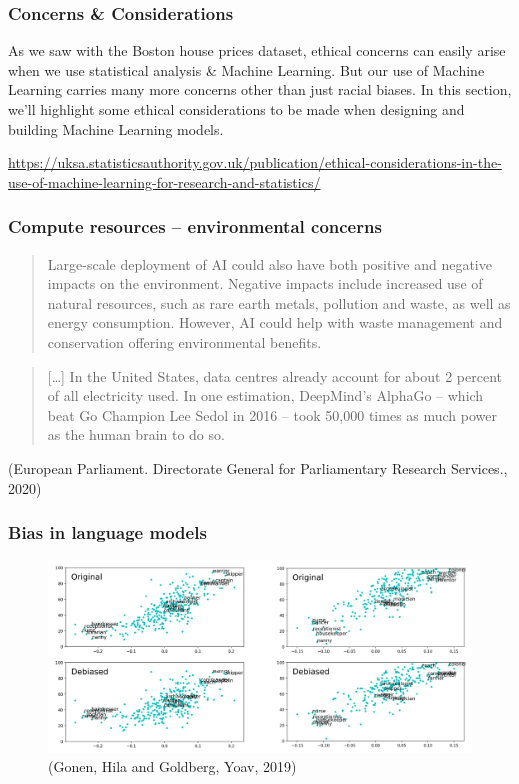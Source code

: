 \documentclass[10pt]{beamer}
\begin{document}
\subsubsection*{Concerns \& Considerations}
\label{sec:org5cfd4b2}

As we saw with the Boston house prices dataset, ethical concerns can easily arise
when we use statistical analysis \& Machine Learning. But our use of Machine Learning
carries many more concerns other than just racial biases. In this section, we'll
highlight some ethical considerations to be made when designing and building Machine
Learning models.

\url{https://uksa.statisticsauthority.gov.uk/publication/ethical-considerations-in-the-use-of-machine-learning-for-research-and-statistics/}

\subsubsection*{Compute resources -- environmental concerns}
\label{sec:org5097e2d}

\begin{quote}
Large-scale deployment of AI could also have both positive and negative impacts on
the environment. Negative impacts include increased use of natural resources, such as
rare earth metals, pollution and waste, as well as energy consumption. However, AI
could help with waste management and conservation offering environmental benefits.
\end{quote}

\begin{quote}
[\ldots{}] In the United States, data centres already account for about 2 percent of all
electricity used. In one estimation, DeepMind's AlphaGo – which beat Go Champion Lee
Sedol in 2016 – took 50,000 times as much power as the human brain to do so.
\end{quote}

({European Parliament. Directorate General for Parliamentary Research Services.}, 2020)

\subsubsection*{Bias in language models}
\label{sec:orgb90afdf}

\begin{figure}[htbp]
\centering
\includegraphics[width=1.0\textwidth]{images/debias.png}
\caption{(Gonen, Hila and Goldberg, Yoav, 2019)}
\end{figure}
\end{document}
